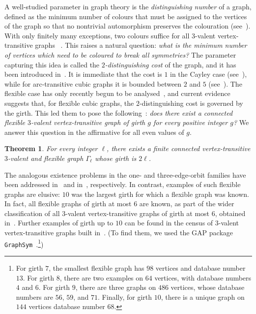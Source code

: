 \documentclass[a4paper]{amsart}
\newcommand{\0}{\mathbf{0}}
\newtheorem{thmx}{Theorem}[]
\theoremstyle{definition}
\begin{document}
A well-studied parameter in graph theory is the \emph{distinguishing number} of a graph, defined as the minimum number of colours that must be assigned to the vertices of the graph so that no nontrivial automorphism preserves the colouration (see~\cite{AlbertsonCollin}). With only finitely many exceptions, two colours suffice for all $3$-valent vertex-transitive graphs ~\cite{HIKST}. This raises a natural question: \emph{what is the minimum number of vertices which need to be coloured to break all symmetries?} The parameter capturing this idea is called the \emph{$2$-distinguishing cost} of the graph, and it has been introduced in~\cite{Boutin}. It is immediate that the cost is \(1\) in the Cayley case (see~\cite{Sabidussi}), while for arc-transitive cubic graphs it is bounded between \(2\) and \(5\) (see~\cite{Tutte}).  The flexible case has only recently begun to be analysed~\cite{Ademir,ILTW}, and current evidence suggests that, for flexible cubic graphs, the $2$-distinguishing cost is governed by the girth. This led them to pose the following~\cite[Question~3.6]{Ademir}: \emph{does there exist a connected flexible $3$-valent vertex-transitive graph of girth $g$ for every positive integer $g$?} We answer this question in the affirmative for all even values of \(g\). 

\begin{thmx}\label{thm}
    For every integer $\ell$, there exists a finite connected vertex-transitive $3$-valent and flexible graph $\Gamma_\ell$ whose girth is $2\ell$.
\end{thmx}

The analogous existence problems in the one- and three-edge-orbit families have been addressed in~\cite{arc-transitive} and in~\cite{JS11}, respectively. In contrast, examples of such flexible graphs are elusive: $10$ was the largest girth for which a flexible graph was known. In fact, all flexible graphs of girth at most $6$ are known, as part of the wider classification of all $3$-valent vertex-transitive graphs of girth at most $6$, obtained in~\cite{EibenJajcaySparl, VidaliPotocnik}. Further examples of girth up to $10$ can be found in the census of $3$-valent vertex-transitive graphs built in~\cite{PotocnikSpigaVerret2013}. (To find them, we used the \textsf{GAP} package \texttt{GraphSym}~\cite{Rhys}.\footnote{For girth $7$, the smallest flexible graph has $98$ vertices and database number $13$. For girth $8$, there are two examples on $64$ vertices, with database numbers $4$ and $6$. For girth $9$, there are three graphs on $486$ vertices, whose database numbers are $56$, $59$, and $71$. Finally, for girth $10$, there is a unique graph on $144$ vertices database number $68$.})
\end{document}
